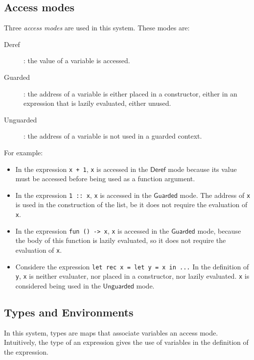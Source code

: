 \documentclass{article}
\newcommand{\Deref}{\mathsf{Deref}}
\newcommand{\Unguarded}{\mathsf{Unguarded}}
\newcommand{\Guarded}{\mathsf{Guarded}}
\begin{document}
\subsection{Access modes}
Three \textit{access modes} are used in this system. These modes are:
\begin{description}
  \item[Deref] : the value of a variable is accessed.
  \item[Guarded] : the address of a variable is either placed in a constructor,
    either in an expression that is lazily evaluated, either unused.
  \item[Unguarded] : the address of a variable is not used in a guarded
    context.
\end{description}

For example:
\begin{itemize}
  \item In the expression \lstinline|x + 1|, \lstinline|x| is accessed in the
    $\Deref$ mode because its value must be accessed before being used as
    a function argument.
  \item In the expression \lstinline|1 :: x|, \lstinline|x| is accessed in the
    $\Guarded$ mode. The address of \lstinline|x| is used in the
    construction of the list, be it does not require the evaluation of
    \lstinline|x|.
  \item In the expression \lstinline|fun () -> x|, \lstinline|x| is accessed in
    the $\Guarded$ mode, because the body of this function is lazily
    evaluated, so it does not require the evaluation of \lstinline|x|.
  \item Considere the expression \lstinline |let rec x = let y = x in ...|
    In the definition of \lstinline|y|, \lstinline|x| is neither evaluater, nor
    placed in a constructor, nor lazily evaluated. \lstinline|x| is considered
    being used in the $\Unguarded$ mode.
\end{itemize}

\subsection{Types and Environments}
In this system, types are maps that associate variables an access mode.
Intuitively, the type of an expression gives the use of variables in the
definition of the expression.
\end{document}
